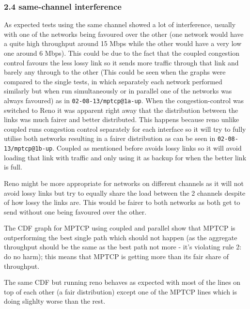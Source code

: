 \subsubsection{2.4 same-channel interference}
As expected tests using the same channel showed a lot of interference, usually
with one of the networks being favoured over the other (one network would have a
quite high throughput around 15 Mbps while the other would have a very low one
around 6 Mbps). This could be due to the fact that the coupled congestion
control favours the less lossy link so it sends more traffic through that link
and barely any through to the other (This could be seen when the graphs were
compared to the single tests, in which separately each network performed
similarly but when run simultaneously or in parallel one of the networks was
always favoured) as in \texttt{02-08-13/mptcp@1a-up}. When the
congestion-control was switched to Reno it was apparent right away that the
distribution between the links was much fairer and better distributed. This
happens because reno unlike coupled runs congestion control separately for each
interface so it will try to fully utilise both networks resulting in a fairer
distribution as can be seen in \texttt{02-08-13/mptcp@1b-up}. Coupled as
mentioned before avoids lossy links so it will avoid loading that link with
traffic and only using it as backup for when the better link is full.

Reno might be more appropriate for networks on different channels as it will not
avoid lossy links but try to equally share the load between the 2 channels
despite of how lossy the links are. This would be fairer to both networks as
both get to send without one being favoured over the other.

The CDF graph for MPTCP using coupled and parallel show that MPTCP is
outperforming the best single path which should not happen (as the aggregate
throughput should be the same as the best path not more - it's violating rule 2:
do no harm); this means that MPTCP is getting more than its fair share of
throughput.

The same CDF but running reno behaves as expected with most of the lines on top
of each other (a fair distribution) except one of the MPTCP lines which is doing
slighlty worse than the rest.
